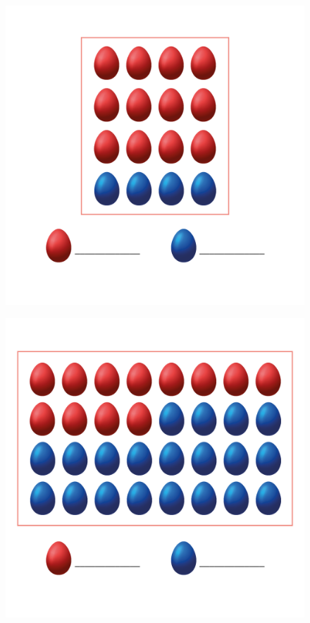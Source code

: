 \begin{figure}[htpb!]
\includegraphics[width=\textwidth]{../ilustracoes/MAT5/SAEB_5ANO_MAT_figura75-1.png}
\end{figure}

\begin{figure}[htpb!]
\includegraphics[width=\textwidth]{../ilustracoes/MAT5/SAEB_5ANO_MAT_figura75-2.png}
\end{figure}

